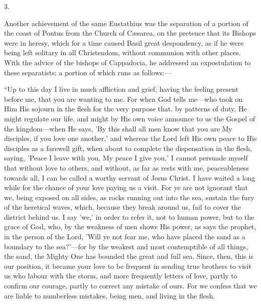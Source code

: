 3.

Another achievement of the same Eustathius was the separation of a
portion of the coast of Pontus from the Church of Cæsarea, on the
pretence that its Bishops were in heresy, which for a time caused
Basil great despondency, as if he were being left solitary in all
Christendom, without communion with other places. With the advice of
the bishops of Cappadocia, he addressed an expostulation to these
separatists; a portion of which runs as follows:—

``Up to this day I live in much affliction and grief, having
the feeling present before me, that you are wanting to me. For when
God tells me—who took on Him His sojourn in the flesh for the very
purpose that, by patterns of duty, He might regulate our life, and
might by His own voice announce to us the Gospel of the kingdom—when
He says, 'By this shall all men know that you are My disciples, if you
love one another,' and whereas the Lord left His own peace to His
disciples as a farewell gift, when about to complete the dispensation
in the flesh, saying, 'Peace I leave with you, My peace I give you,' I
cannot persuade myself that without love to others, and without, as
far as rests with me, peaceableness towards all, I can be called a
worthy servant of Jesus Christ. I have waited a long while for the
chance of your love paying us a visit. For ye are not ignorant that
we, being exposed on all sides, as rocks running out into the sea,
sustain the fury of the heretical waves, which, because they break
around us, fail to cover the district behind us. I say 'we,' in order
to refer it, not to human power, but to the grace of God, who, by the
weakness of men shows His power, as says the prophet, in the person of
the Lord, 'Will ye not fear me, who have placed the sand as a boundary
to the sea?'—for by the weakest and most contemptible of all things,
the sand, the Mighty One has bounded the great and full sea.
Since, then, this is our position, it became your
love to be frequent in sending true brothers to visit us who labour
with the storm, and more frequently letters of love, partly to confirm
our courage, partly to correct any mistake of ours. For we confess
that we are liable to numberless mistakes, being men, and living in
the flesh.

